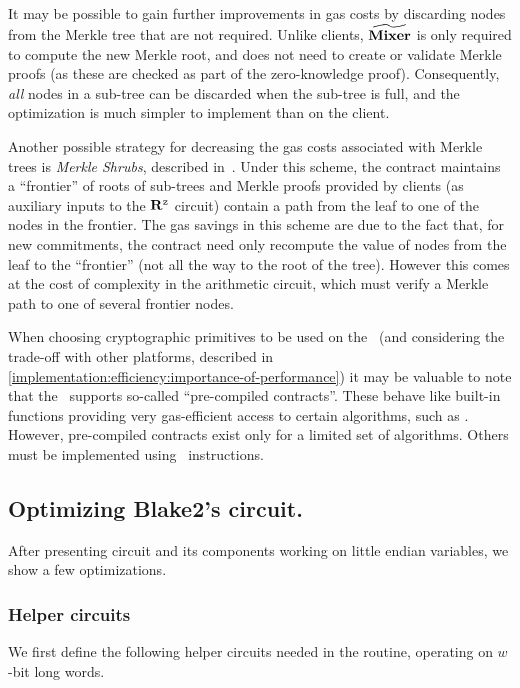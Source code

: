 It may be possible to gain further improvements in gas costs by discarding nodes from the Merkle tree that are not required. Unlike clients, $\widetilde{\mathbf{Mixer}}$ is only required to compute the new Merkle root, and does not need to create or validate Merkle proofs (as these are checked as part of the zero-knowledge proof). Consequently, \emph{all} nodes in a sub-tree can be discarded when the sub-tree is full, and the optimization is much simpler to implement than on the client.

Another possible strategy for decreasing the gas costs associated with Merkle trees is \emph{Merkle Shrubs}, described in~\cite[Section 2.2]{merkle-shrubs}. Under this scheme, the contract maintains a ``frontier'' of roots of sub-trees and Merkle proofs provided by clients (as auxiliary inputs to the $\mathbf{R}^{\texttt{z}}$ circuit) contain a path from the leaf to one of the nodes in the frontier. The gas savings in this scheme are due to the fact that, for new commitments, the contract need only recompute the value of nodes from the leaf to the ``frontier'' (not all the way to the root of the tree). However this comes at the cost of complexity in the arithmetic circuit, which must verify a Merkle path to one of several frontier nodes.

When choosing cryptographic primitives to be used on the \evm~(and considering the trade-off with other platforms, described in \cref{implementation:efficiency:importance-of-performance}) it may be valuable to note that the \evm~supports so-called ``pre-compiled contracts''. These behave like built-in functions providing very gas-efficient access to certain algorithms, such as \keccak. However, pre-compiled contracts exist only for a limited set of algorithms. Others must be implemented using \evm~instructions.

\subsection{Optimizing Blake2's circuit.}\label{implementation:efficiency:blake}

After presenting  circuit and its components working on little endian variables, we show a few optimizations.

\subsubsection{Helper circuits}\label{implementation:efficiency:blake:helper-circuits}
We first define the following helper circuits needed in the  routine, operating on $w$-bit long words.

